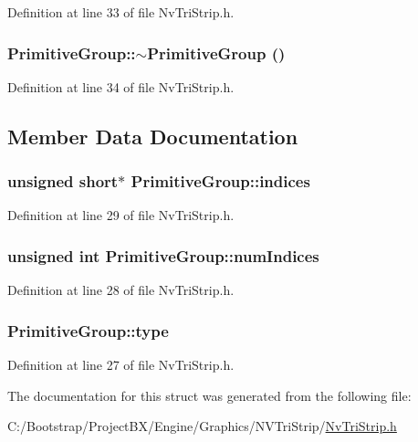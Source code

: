 Definition at line 33 of file NvTriStrip.h.\hypertarget{struct_primitive_group_1629c6d3a3340bfea6376bcb48ac992a}{
\subsubsection[{$\sim$PrimitiveGroup}]{\setlength{\rightskip}{0pt plus 5cm}PrimitiveGroup::$\sim$PrimitiveGroup ()}}
\label{struct_primitive_group_1629c6d3a3340bfea6376bcb48ac992a}




Definition at line 34 of file NvTriStrip.h.

\subsection{Member Data Documentation}
\hypertarget{struct_primitive_group_307770a1acceb3450fcf0e9af4ee3ec8}{
\subsubsection[{indices}]{\setlength{\rightskip}{0pt plus 5cm}unsigned short$\ast$ {\bf PrimitiveGroup::indices}}}
\label{struct_primitive_group_307770a1acceb3450fcf0e9af4ee3ec8}




Definition at line 29 of file NvTriStrip.h.\hypertarget{struct_primitive_group_83b7a3200f28a02beeb18b648c341e7e}{
\subsubsection[{numIndices}]{\setlength{\rightskip}{0pt plus 5cm}unsigned int {\bf PrimitiveGroup::numIndices}}}
\label{struct_primitive_group_83b7a3200f28a02beeb18b648c341e7e}




Definition at line 28 of file NvTriStrip.h.\hypertarget{struct_primitive_group_c0a1329776ca79245b14359eb0bcef0b}{
\subsubsection[{type}]{ {\bf PrimitiveGroup::type}}}
\label{struct_primitive_group_c0a1329776ca79245b14359eb0bcef0b}




Definition at line 27 of file NvTriStrip.h.

The documentation for this struct was generated from the following file:\begin{CompactItemize}
\item 
C:/Bootstrap/ProjectBX/Engine/Graphics/NVTriStrip/\hyperlink{_nv_tri_strip_8h}{NvTriStrip.h}\end{CompactItemize}
